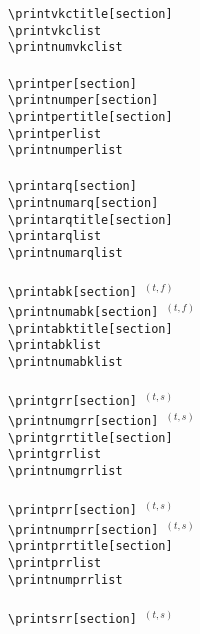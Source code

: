 \documentclass[12pt,a4paper]{article}
\begin{document}
\verb|\printvkctitle[section]| \\
\verb|\printvkclist| \\
\verb|\printnumvkclist| \\[1.75ex]
\textbf{\gpertitlename} \\[0.25ex]
\verb|\printper[section]| \\
\verb|\printnumper[section]| \\[0.5ex]
\verb|\printpertitle[section]| \\
\verb|\printperlist| \\
\verb|\printnumperlist| \\[1.75ex]
\textbf{\garqtitlename} \\[0.25ex]
\verb|\printarq[section]| \\
\verb|\printnumarq[section]| \\[0.5ex]
\verb|\printarqtitle[section]| \\
\verb|\printarqlist| \\
\verb|\printnumarqlist| \\[1.75ex]
\textbf{\gabktitlename} \\[0.25ex]
\verb|\printabk[section]|~$^{(t, f)}$ \\
\verb|\printnumabk[section]|~$^{(t, f)}$ \\[0.5ex]
\verb|\printabktitle[section]| \\
\verb|\printabklist| \\
\verb|\printnumabklist| \\[1.75ex]
\textbf{\ggrrtitlename} \\[0.25ex]
\verb|\printgrr[section]|~$^{(t, s)}$ \\
\verb|\printnumgrr[section]|~$^{(t, s)}$ \\[0.5ex]
\verb|\printgrrtitle[section]| \\
\verb|\printgrrlist| \\
\verb|\printnumgrrlist| \\[1.75ex]
\textbf{\gprrtitlename} \\[0.25ex]
\verb|\printprr[section]|~$^{(t, s)}$ \\
\verb|\printnumprr[section]|~$^{(t, s)}$ \\[0.5ex]
\verb|\printprrtitle[section]| \\
\verb|\printprrlist| \\
\verb|\printnumprrlist| \\[1.75ex]
\textbf{\gsrrtitlename} \\[0.25ex]
\verb|\printsrr[section]|~$^{(t, s)}$ \\
\end{document}
